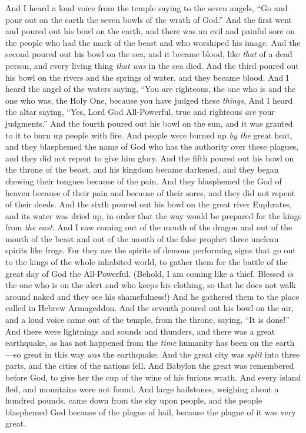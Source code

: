 \begin{biblechapter} %
 And I heard a loud voice from the temple saying to the seven angels, “Go and pour out on the earth the seven bowls of the wrath of God.”
\verse And the first went and poured out his bowl on the earth, and there was an evil and painful sore on the people who had the mark of the beast and who worshiped his image.
\verse And the second poured out his bowl on the sea, and it became blood, like \textit{that} of a dead person, and every living thing \textit{that was} in the sea died.
\verse And the third poured out his bowl on the rivers and the springs of water, and they became blood.
\verse And I heard the angel of the waters saying,
\verse “You are righteous, the one who is and the one who was, the Holy One, 
because you have judged these \textit{things},
\verse And I heard the altar saying, “Yes, Lord God All-Powerful, 
true and righteous \textit{are} your judgments.”
\verse And the fourth poured out his bowl on the sun, and it was granted to it to burn up people with fire.
\verse And people were burned up \textit{by the} great heat, and they blasphemed the name of God who has the authority over these plagues, and they did not repent to give him glory.
\verse And the fifth poured out his bowl on the throne of the beast, and his kingdom became darkened, and they began chewing their tongues because of the pain.
\verse And they blasphemed the God of heaven because of their pain and because of their sores, and they did not repent of their deeds.
\verse And the sixth poured out his bowl on the great river Euphrates, and its water was dried up, in order that the way would be prepared for the kings from \textit{the east}.
\verse And I saw coming out of the mouth of the dragon and out of the mouth of the beast and out of the mouth of the false prophet three unclean spirits like frogs.
\verse For they are the spirits of demons performing signs that go out to the kings of the whole inhabited world, to gather them for the battle of the great day of God the All-Powerful.
\verse (Behold, I am coming like a thief. Blessed \textit{is} the one who is on the alert and who keeps his clothing, so that he does not walk around naked and they see his shamefulness!)
\verse And he gathered them to the place called in Hebrew Armageddon.
\verse And the seventh poured out his bowl on the air, and a loud voice came out of the temple, from the throne, saying, “It is done!”
\verse And there were lightnings and sounds and thunders, and there was a great earthquake, as has not happened from the \textit{time} humanity has been on the earth—so great in this way \textit{was} the earthquake.
\verse And the great city was \textit{split} into three parts, and the cities of the nations fell. And Babylon the great was remembered before God, to give her the cup of the wine of his furious wrath.
\verse And every island fled, and mountains were not found.
\verse And large hailstones, weighing about a hundred pounds, came down from the sky upon people, and the people blasphemed God because of the plague of hail, because the plague of it was very great.
\end{biblechapter}

